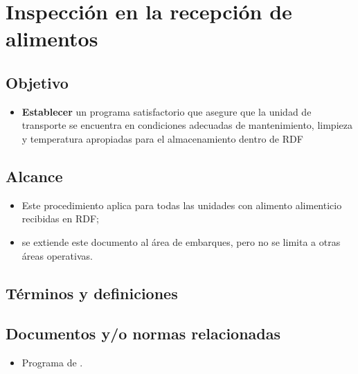 \thispagestyle{formato-PI}
\renewcommand{\MayorVer}{2}
\renewcommand{\MenorVer}{1}
\renewcommand{\FechaPub}{2023--01}
\renewcommand{\TipoID}{PRO}
\renewcommand{\Titulo}{Inspección en la recepción de alimentos}

\section{\Titulo}
\renewcommand{\Codigo}{\Prog--\thesection--\TipoID}


\subsection{Objetivo}
\begin{itemize}
	\item \textbf{Establecer} un programa satisfactorio que asegure que la unidad de transporte se encuentra en condiciones adecuadas de mantenimiento, limpieza y temperatura apropiadas para el almacenamiento dentro de \gls{RDF}
\end{itemize}

\subsection{Alcance}
\begin{itemize}
	\item Este procedimiento aplica para todas las unidades con alimento alimenticio recibidas en RDF;\@
	\item se extiende este documento al área de embarques, pero no se limita a otras áreas operativas.
\end{itemize}

\subsection{Términos y definiciones}
\begin{description}
\end{description}

\subsection{Documentos y/o normas relacionadas}
\begin{itemize}
	\item Programa de .
\end{itemize}

